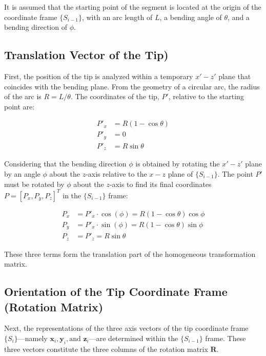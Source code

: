 \documentclass[conference]{IEEEtran}
\begin{document}
It is assumed that the starting point of the segment is located at the origin of the coordinate frame $\{S_{i-1}\}$, with an arc length of $L$, a bending angle of $\theta$, and a bending direction of $\phi$.

\subsection{Translation Vector of the Tip)}
First, the position of the tip is analyzed within a temporary $x'-z'$ plane that coincides with the bending plane. From the geometry of a circular arc, the radius of the arc is $R = L / \theta$. The coordinates of the tip, $P'$, relative to the starting point are:

\begin{align*}
    P'_x &= R(1 - \cos\theta) \\
    P'_y &= 0 \\
    P'_z &= R\sin\theta
\end{align*}

Considering that the bending direction $\phi$ is obtained by rotating the $x'-z'$ plane by an angle $\phi$ about the $z$-axis relative to the $x-z$ plane of $\{S_{i-1}\}$. The point $P'$ must be rotated by $\phi$ about the $z$-axis to find its final coordinates $P = [P_x, P_y, P_z]^T$ in the $\{S_{i-1}\}$ frame:

\begin{align*}
    P_x &= P'_x \cdot \cos(\phi) = R(1 - \cos\theta)\cos\phi \\
    P_y &= P'_x \cdot \sin(\phi) = R(1 - \cos\theta)\sin\phi \\
    P_z &= P'_z = R\sin\theta
\end{align*}

These three terms form the translation part of the homogeneous transformation matrix.

\subsection{Orientation of the Tip Coordinate Frame (Rotation Matrix)}
Next, the representations of the three axis vectors of the tip coordinate frame $\{S_i\}$—namely $\mathbf{x}_i, \mathbf{y}_i, \text{and } \mathbf{z}_i$—are determined within the $\{S_{i-1}\}$ frame. These three vectors constitute the three columns of the rotation matrix $\mathbf{R}$.
\end{document}
